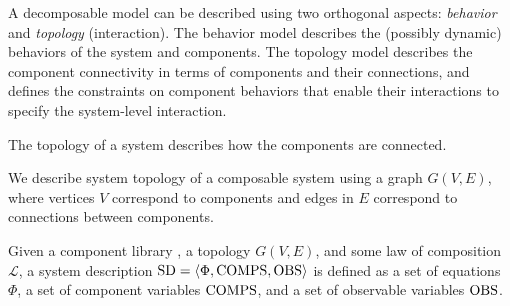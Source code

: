 A decomposable model can be described using two orthogonal aspects:
\textit{behavior} and \textit{topology} (interaction). The behavior
model describes the (possibly dynamic) behaviors of the system and
components. The topology model describes the component connectivity in
terms of components and their connections, and defines the constraints
on component behaviors that enable their interactions to specify the
system-level interaction.
\par
The topology of a system describes how the components are connected.
%
\begin{definition}[Topology]
%
We describe system topology of a composable system using a graph $G(V,
E)$, where vertices $V$ correspond to components and edges in $E$
correspond to connections between components.
%
\end{definition}
%
\begin{definition}
%
Given a component library \cl, a topology $G(V, E)$, and some law of
composition $\mathcal{L}$, a system description $\mathrm{SD} = \langle\Phi,
\mathrm{COMPS}, \mathrm{OBS}\rangle$ is defined as a set of
equations $\Phi$, a set of component variables $\mathrm{COMPS}$, and a set of
observable variables $\mathrm{OBS}$.
%
\end{definition}
%
%
%
%
%

